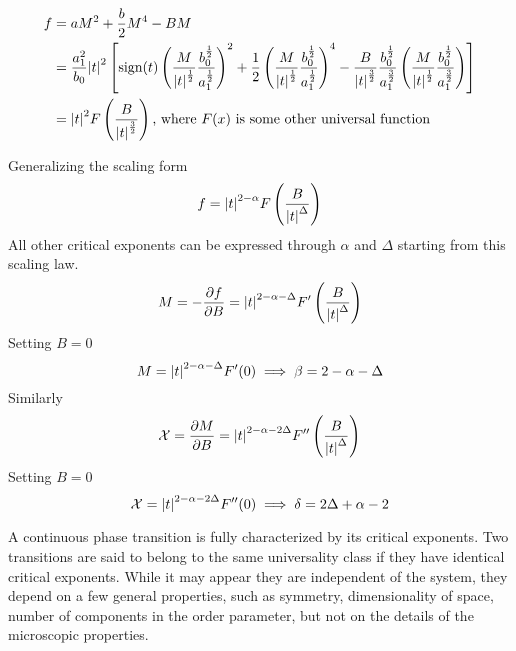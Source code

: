 \documentclass[12pt,a4paper,titlepage]{article}
\newcommand{\trm}[1]{\textrm{#1}} %
\newcommand{\Chi}{\mathcal{X}} %
\newcommand{\sign}{\trm{sign}}
\begin{document}
\begin{equation}
\begin{aligned}
f&=aM^{2}+\frac{b}{2}M^{4}-BM\\
&=\frac{a_{1}^{2}}{b_{0}}\abs{t}^{2}\left[\sign(t)\left(\frac{M}{\abs{t}^{\frac{1}{2}}}\frac{b_{0}^{\frac{1}{2}}}{a_{1}^{\frac{1}{2}}}\right)^{2}+\frac{1}{2}\left(\frac{M}{\abs{t}^{\frac{1}{2}}}\frac{b_{0}^{\frac{1}{2}}}{a_{1}^{\frac{1}{2}}}\right)^{4}-\frac{B}{\abs{t}^{\frac{3}{2}}}\frac{b_{0}^{\frac{1}{2}}}{a_{1}^{\frac{3}{2}}}\left(\frac{M}{\abs{t}^{\frac{1}{2}}}\frac{b_{0}^{\frac{1}{2}}}{a_{1}^{\frac{3}{2}}}\right)\right]\\
&=\abs{t}^{2}F\left(\frac{B}{\abs{t}^{\frac{3}{2}}}\right)\trm{, where $F(x)$ is some other universal function}
\end{aligned}
\end{equation}

Generalizing the scaling form
\begin{equation}
f=\abs{t}^{2-\alpha}F\left(\frac{B}{\abs{t}^{\Delta}}\right)
\end{equation}
All other critical exponents can be expressed through $\alpha$ and $\Delta$ starting from this scaling law.
\begin{equation}
M=-\pdv{f}{B}=\abs{t}^{2-\alpha-\Delta}F^{\prime}\left(\frac{B}{\abs{t}^{\Delta}}\right)
\end{equation}
Setting $B=0$
\begin{equation}
M=\abs{t}^{2-\alpha-\Delta}F^{\prime}(0)\implies\beta=2-\alpha-\Delta
\end{equation}
Similarly
\begin{equation}
\Chi=\pdv{M}{B}=\abs{t}^{2-\alpha-2\Delta}F^{\prime\prime}\left(\frac{B}{\abs{t}^{\Delta}}\right)
\end{equation}
Setting $B=0$
\begin{equation}
\Chi=\abs{t}^{2-\alpha-2\Delta}F^{\prime\prime}(0)\implies\delta=2\Delta+\alpha-2
\end{equation}

A continuous phase transition is fully characterized by its critical exponents. Two transitions are said to belong to the same universality class if they have identical critical exponents. While it may appear they are independent of the system, they depend on a few general properties, such as symmetry, dimensionality of space, number of components in the order parameter, but not on the details of the microscopic properties.\\
\end{document}
